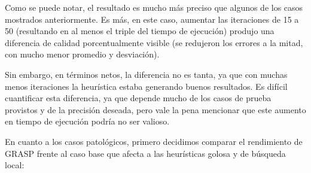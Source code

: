 Como se puede notar, el resultado es mucho más preciso que algunos de los casos mostrados anteriormente. Es más, en este caso, aumentar las iteraciones de 15 a 50 (resultando en al menos el triple del tiempo de ejecución) produjo una diferencia de calidad porcentualmente visible (se redujeron los errores a la mitad, con mucho menor promedio y desviación).

Sin embargo, en términos netos, la diferencia no es tanta, ya que con muchas menos iteraciones la heurística estaba generando buenos resultados. Es difícil cuantificar esta diferencia, ya que depende mucho de los casos de prueba provistos y de la precisión deseada, pero vale la pena mencionar que este aumento en tiempo de ejecución podría no ser valioso.

En cuanto a los casos patológicos, primero decidimos comparar el rendimiento de GRASP frente al caso base que afecta a las heurísticas golosa y de búsqueda local:

